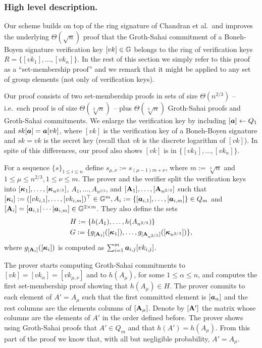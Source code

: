 \subsubsection{High level description.}
Our scheme builds on top of the ring signature of Chandran et al.~and improves the underlying $\Theta(\sqrt{n})$ proof that the Groth-Sahai commitment of a Boneh-Boyen signature verification key $[vk]\in\mathbb{G}$ belongs to the ring of verification keys $R=\{[vk_1],\ldots,[vk_n]\}$. In the rest of this section we simply refer to this proof as a ``set-membership proof'' and we remark that it might be applied to any set of group elements (not only of verification keys).

Our proof consists of two set-membership proofs in sets of size $\Theta(n^{2/3})$ -- i.e.~each proof is of size $\Theta(\sqrt[3]{n})$ --  plus $\Theta(\sqrt[3]{n})$ Groth-Sahai proofs and Groth-Sahai commitments.
We enlarge the verification key by including $[{\boldsymbol{a}}]\gets Q_1$ and $sk[{\boldsymbol{a}}]={\boldsymbol{a}}[vk]$, where $[vk]$ is the verification key of a Boneh-Boyen signature and $sk=vk$ is the secret key (recall that $vk$ is the discrete logarithm of $[vk]$). In spite of this differences, our proof also shows $[vk]$ is in $\{[vk_1],\ldots,[vk_n]\}$.

For a sequence $\{s\}_{1\leq i \leq n}$ define $s_{\mu,\nu}:=s_{(\mu-1)m+\nu}$, where $m:=\sqrt[3]{n}$ and $1\leq\mu\leq n^{2/3},1\leq \nu\leq m$.  The prover and the verifier split the verification keys into $[{\boldsymbol{\kappa}}_1],\ldots, [{\boldsymbol{\kappa}}_{n^{2/3}}]$, $A_1,\ldots, A_{n^{2/3}}$, and $[\mathbf{{A}}_1],\ldots, [\mathbf{{A}}_{n^{2/3}}]$ such that $[{\boldsymbol{\kappa}}_i]:= ([vk_{i,1}],\ldots,[vk_{i,m}])^\top\in\mathbb{G}^m, A_i:=\{[{\boldsymbol{a}}_{i,1}],\ldots,[{\boldsymbol{a}}_{i,m}]\}\in Q_m$ and $[\mathbf{{A}}_i]=[{\boldsymbol{a}}_{i,1}|\cdots|{\boldsymbol{a}}_{i,m}]\in\mathbb{G}^{2\times m}$. They also define the sets
\begin{align*}
&H:=\{h(A_1),\ldots,\allowbreak h(A_{n^{2/3}})\}\\
&G:=\{g_{[\mathbf{{A}}_1]}([{\boldsymbol{\kappa}}_1]),\allowbreak\ldots,g_{[\mathbf{{A}}_{n^{2/3}}]}([{\boldsymbol{\kappa}}_{n^{2/3}}])\},
\end{align*}
where $g_{[\mathbf{{A}}_i]}([{\boldsymbol{\kappa}}_i])$ is computed as $\sum_{i=1}^m {\boldsymbol{a}}_{i,j}[vk_{i,j}]$.

The prover starts computing Groth-Sahai commitments to $[vk]=[vk_\alpha]=[vk_{\mu,\nu}]$ and to $h(A_\mu)$, for some $1\leq \alpha \leq n$, and computes the first set-membership proof showing that $h(A_\mu)\in H$.
The prover commits to each element of $A'=A_\mu$ such that the first committed element is $[{\boldsymbol{a}}_\alpha]$ and the rest columns are the elements columns of $[\mathbf{{A}}_\mu]$. Denote by $[\mathbf{{A}}']$ the matrix whose columns are the elements of $A'$ in the order defined before.  The prover shows using Groth-Sahai proofs that $A'\in Q_m$ and that $h(A')=h(A_\mu)$. From this part of the proof we know that, with all but negligible probability, $A'=A_\mu$.


